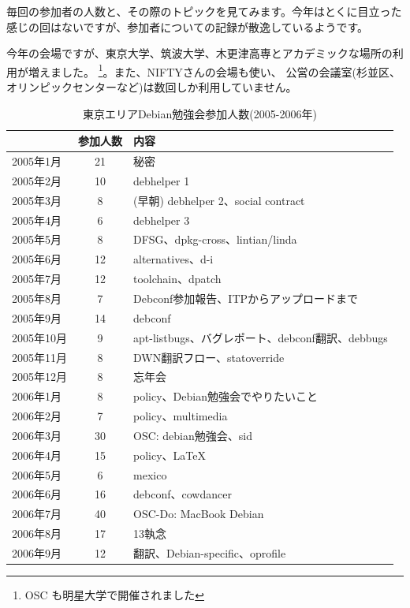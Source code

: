 \documentclass[mingoth,a4paper]{jsarticle}
\begin{document}
毎回の参加者の人数と、その際のトピックを見てみます。今年はとくに目立った
感じの回はないですが、参加者についての記録が散逸しているようです。

今年の会場ですが、東京大学、筑波大学、木更津高専とアカデミックな場所の利
用が増えました。
\footnote{OSC も明星大学で開催されました}。また、NIFTYさんの会場も使い、
公営の会議室(杉並区、オリンピックセンターなど)は数回しか利用していません。

\begin{table}[H]
\begin{minipage}{0.5\hsize}
 \caption{東京エリアDebian勉強会参加人数(2005-2006年)}\label{tab:count}
 \begin{center}
  \begin{tabular}{|l|c|p{10em}|}
 \hline
   & 参加人数 & 内容 \\
 \hline
   2005年1月 & 21 & 秘密\\
   2005年2月 & 10 & debhelper 1\\
   2005年3月 & 8 &  (早朝) debhelper 2、social contract\\
   2005年4月 & 6 & debhelper 3\\
   2005年5月 & 8 & DFSG、dpkg-cross、lintian/linda\\
   2005年6月 & 12 & alternatives、d-i\\
   2005年7月 & 12 & toolchain、dpatch\\
   2005年8月 & 7 & Debconf参加報告、ITPからアップロードまで\\
   2005年9月 & 14 & debconf\\
   2005年10月 & 9 & apt-listbugs、バグレポート、debconf翻訳、debbugs\\
   2005年11月 & 8 & DWN翻訳フロー、statoverride\\
   2005年12月 & 8 & 忘年会\\
   2006年1月 & 8 & policy、Debian勉強会でやりたいこと\\
   2006年2月 & 7 & policy、multimedia \\
   2006年3月 & 30 & OSC: debian勉強会、sid \\
   2006年4月 & 15 & policy、\LaTeX{} \\
   2006年5月 & 6 & mexico \\
   2006年6月 & 16 & debconf、cowdancer\\
   2006年7月 & 40 & OSC-Do: MacBook Debian \\
   2006年8月 & 17 & 13執念 \\
   2006年9月 & 12 & 翻訳、Debian-specific、oprofile \\

\end{tabular}
\end{center}
\end{minipage}
\end{table}
\end{document}
